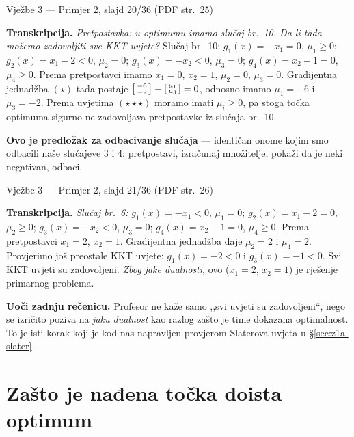 \begin{izvor}{Vježbe 3 --- Primjer 2, slajd 20/36 (PDF str.~25)}

\textbf{Transkripcija.} \emph{Pretpostavka: u optimumu imamo slučaj br.\ 10. Da
li tada možemo zadovoljiti sve KKT uvjete?} Slučaj br.\ 10:
$g_1(x) = -x_1 = 0$, $\mu_1 \geq 0$; $g_2(x) = x_1 - 2 < 0$, $\mu_2 = 0$;
$g_3(x) = -x_2 < 0$, $\mu_3 = 0$; $g_4(x) = x_2 - 1 = 0$, $\mu_4 \geq 0$.
Prema pretpostavci imamo $x_1 = 0$, $x_2 = 1$, $\mu_2 = 0$, $\mu_3 = 0$.
Gradijentna jednadžba $(\star)$ tada postaje
$\begin{bsmallmatrix}-6 \\ -2\end{bsmallmatrix} - \begin{bsmallmatrix}\mu_1 \\ \mu_3\end{bsmallmatrix} = 0$,
odnosno imamo $\mu_1 = -6$ i $\mu_3 = -2$. Prema uvjetima $(\star\star\star)$
moramo imati $\mu_i \geq 0$, pa stoga točka optimuma sigurno ne zadovoljava
pretpostavke iz slučaja br.\ 10.

\textbf{Ovo je predložak za odbacivanje slučaja} --- identičan onome kojim smo
odbacili naše slučajeve 3 i 4: pretpostavi, izračunaj množitelje, pokaži da je
neki negativan, odbaci.
\end{izvor}

\begin{izvor}{Vježbe 3 --- Primjer 2, slajd 21/36 (PDF str.~26)}

\textbf{Transkripcija.} \emph{Slučaj br.\ 6:} $g_1(x) = -x_1 < 0$, $\mu_1 = 0$;
$g_2(x) = x_1 - 2 = 0$, $\mu_2 \geq 0$; $g_3(x) = -x_2 < 0$, $\mu_3 = 0$;
$g_4(x) = x_2 - 1 = 0$, $\mu_4 \geq 0$. Prema pretpostavci $x_1 = 2$, $x_2 = 1$.
Gradijentna jednadžba daje $\mu_2 = 2$ i $\mu_4 = 2$. Provjerimo još preostale
KKT uvjete: $g_1(x) = -2 < 0$ i $g_3(x) = -1 < 0$. Svi KKT uvjeti su zadovoljeni.
\emph{Zbog jake dualnosti}, ovo ($x_1 = 2$, $x_2 = 1$) je rješenje primarnog
problema.

\textbf{Uoči zadnju rečenicu.} Profesor ne kaže samo ,,svi uvjeti su
zadovoljeni``, nego se izričito poziva na \emph{jaku dualnost} kao razlog zašto
je time dokazana optimalnost. To je isti korak koji je kod nas napravljen
provjerom Slaterova uvjeta u \S\ref{sec:z1a-slater}.
\end{izvor}

\section{Zašto je nađena točka doista optimum}
\label{sec:z1b-dovoljni}

